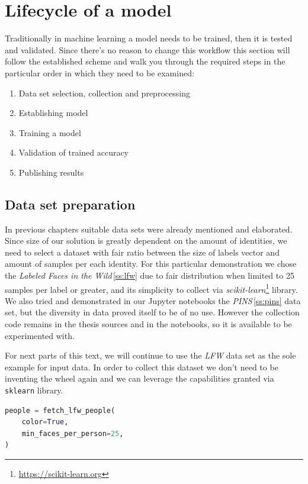 \section{Lifecycle of a model}

Traditionally in machine learning a model needs to be trained, then it is tested and validated. Since there's no reason to change this workflow this section will follow the established scheme and walk you through the required steps in the particular order in which they need to be examined:

\begin{enumerate}
    \item Data set selection, collection and preprocessing
    \item Establishing model
    \item Training a model
    \item Validation of trained accuracy
    \item Publishing results
\end{enumerate}

\subsection{Data set preparation}

In previous chapters suitable data sets were already mentioned and elaborated. Since size of our solution is greatly dependent on the amount of identities, we need to select a dataset with fair ratio between the size of labels vector and amount of samples per each identity. For this particular demonstration we chose the \textit{Labeled Faces in the Wild}\,\ref{ss:lfw} due to fair distribution when limited to 25 samples per label or greater, and its simplicity to collect via \textit{scikit-learn}\footnote{\url{https://scikit-learn.org}} library. We also tried and demonstrated in our Jupyter notebooks the \textit{PINS}\,\ref{ss:pins} data set, but the diversity in data proved itself to be of no use. However the collection code remains in the thesis sources and in the notebooks, so it is available to be experimented with.

For next parts of this text, we will continue to use the \textit{LFW} data set as the sole example for input data. In order to collect this dataset we don't need to be inventing the wheel again and we can leverage the capabilities granted via \texttt{sklearn} library.

\begin{lstlisting}[language=Python, caption=Collect Labeled Faces in the Wild dataset]
people = fetch_lfw_people(
    color=True,
    min_faces_per_person=25,
)
\end{lstlisting}

